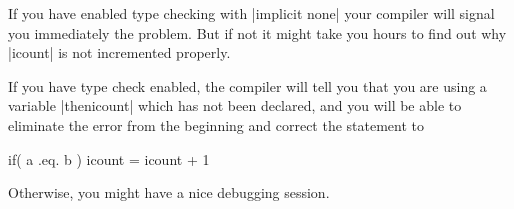 \documentclass[a4paper]{report}
\newcommand{\str} [1] {\VerbatimInput{#1}}
\begin{document}
If you have enabled type checking with |implicit none| your compiler
will signal you immediately the problem. But if not it might take
you hours to find out why |icount| is not incremented properly.

If you have type check enabled, the compiler will tell you that you are
using a variable |thenicount| which has not been declared, and you
will be able to eliminate the error from the beginning and correct the 
statement to

\begin{code}
	if( a .eq. b ) icount = icount + 1
\end{code}

Otherwise, you might have a nice debugging session.


\str{basic.str}

\end{document}
